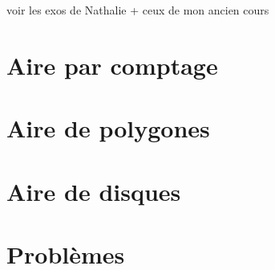 \begin{colonne*exercice}    %
    voir les exos de Nathalie + ceux de mon ancien cours
    \section{Aire par comptage}
    
    
        
    \section{Aire de polygones}
    
    
    
    
    \section{Aire de disques}    
    
    
    \section{Problèmes}
    
    
\end{colonne*exercice}        %
